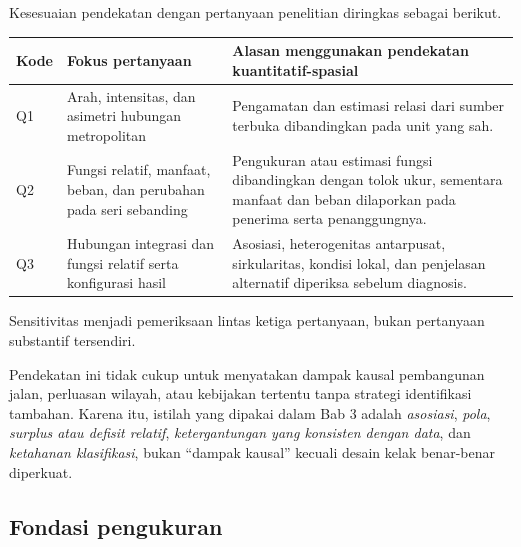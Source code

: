 \documentclass[11pt,a4paper,oneside,openany,indonesian]{report}
\begin{document}
Kesesuaian pendekatan dengan pertanyaan penelitian diringkas sebagai
berikut.

{\def\LTcaptype{none} %
\begin{longtable}[]{@{}
  >{\raggedright\arraybackslash}p{}
  >{\raggedright\arraybackslash}p{}
  >{\raggedright\arraybackslash}p{}@{}}
\toprule\noalign{}
\begin{minipage}[b]{\linewidth}\raggedright
Kode
\end{minipage} & \begin{minipage}[b]{\linewidth}\raggedright
Fokus pertanyaan
\end{minipage} & \begin{minipage}[b]{\linewidth}\raggedright
Alasan menggunakan pendekatan kuantitatif-spasial
\end{minipage} \\
\midrule\noalign{}
\endhead
\bottomrule\noalign{}
\endlastfoot
Q1 & Arah, intensitas, dan asimetri hubungan metropolitan & Pengamatan
dan estimasi relasi dari sumber terbuka dibandingkan pada unit yang
sah. \\
Q2 & Fungsi relatif, manfaat, beban, dan perubahan pada seri sebanding &
Pengukuran atau estimasi fungsi dibandingkan dengan tolok ukur, sementara
manfaat dan beban dilaporkan pada penerima serta penanggungnya. \\
Q3 & Hubungan integrasi dan fungsi relatif serta konfigurasi hasil &
Asosiasi, heterogenitas antarpusat, sirkularitas, kondisi lokal, dan
penjelasan alternatif diperiksa sebelum diagnosis. \\
\end{longtable}
}

Sensitivitas menjadi pemeriksaan lintas ketiga pertanyaan, bukan
pertanyaan substantif tersendiri.

Pendekatan ini tidak cukup untuk menyatakan dampak kausal pembangunan
jalan, perluasan wilayah, atau kebijakan tertentu tanpa strategi
identifikasi tambahan. Karena itu, istilah yang dipakai dalam Bab 3
adalah \emph{asosiasi}, \emph{pola}, \emph{surplus atau defisit
relatif}, \emph{ketergantungan yang konsisten dengan data}, dan
\emph{ketahanan klasifikasi}, bukan ``dampak kausal'' kecuali desain
kelak benar-benar diperkuat.

\subsection{Fondasi pengukuran}\label{fondasi-pengukuran}
\end{document}
